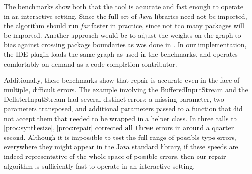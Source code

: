 The benchmarks show both that the tool is accurate and fast enough to operate in an interactive setting. Since the full set of Java libraries need not be imported, the algorithm should run \textit{far} faster in practice, since not too many packages will be imported. Another approach would be to adjust the weights on the graph to bias against crossing package boundaries as was done in \citep{MandelinetALL2005Jungloid}. In our implementation, the IDE plugin loads the same graph as used in the benchmarks, and operates comfortably on-demand as a code completion contributor.

Additionally, these benchmarks show that repair is accurate even in the face of multiple, difficult errors. The example involving the BufferedInputStream and the DeflaterInputStream had several distinct errors: a missing parameter, two parameters transposed, and additional parameters passed to a function that did not accept them that needed to be wrapped in a helper class. In three calls to \ref{proc:synthesize}, \ref{proc:repair} corrected \textbf{all three} errors in around a quarter second. Although it is impossible to test the full range of possible type errors, everywhere they might appear in the Java standard library, if these speeds are indeed representative of the whole space of possible errors, then our repair algorithm is sufficiently fast to operate in an interactive setting.